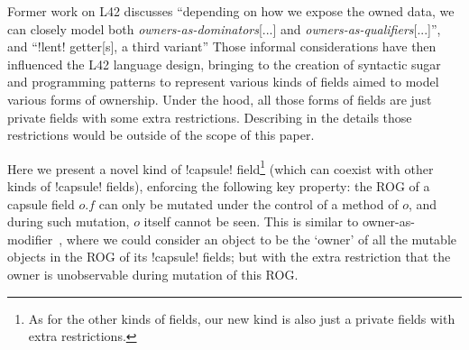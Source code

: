 


Former work on L42 discusses ``depending on how we expose the owned data, we can closely model both \emph{owners-as-dominators}[...] and \emph{owners-as-qualifiers}[...]''\cite{GIANNINI2019145}, and  ``\Q!lent! getter[s], a third variant''\cite{GIANNINI2019145}%
Those informal considerations have then influenced the L42 language design,
bringing to the creation of syntactic sugar and programming patterns to represent various kinds of \Q@capsule@ fields aimed to model various forms of ownership. Under the hood, all those forms of \Q@capsule@ fields are just private \Q@mut@ fields with some extra restrictions. Describing in the details those restrictions would be outside of the scope of this paper.

Here we present a novel kind of \Q!capsule! field\footnote{As for the other kinds of \Q@capsule@ fields, our new kind is also just 
a private \Q@mut@ fields with extra restrictions.} (which can coexist with other kinds of \Q!capsule! fields),
enforcing the following key property:
the ROG of a capsule field $o.f$ can only be mutated under the control of a \Q@mut@ method of $o$, and during such mutation, $o$ itself cannot be seen.
This is similar to owner-as-modifier~\cite{Dietl05universes:lightweight,10.1007/978-3-540-92188-2_4}, 
where we could consider an object to be the `owner' of all the mutable objects in the ROG of its \Q!capsule! fields; but with the extra restriction that the owner is unobservable during mutation of this ROG.

